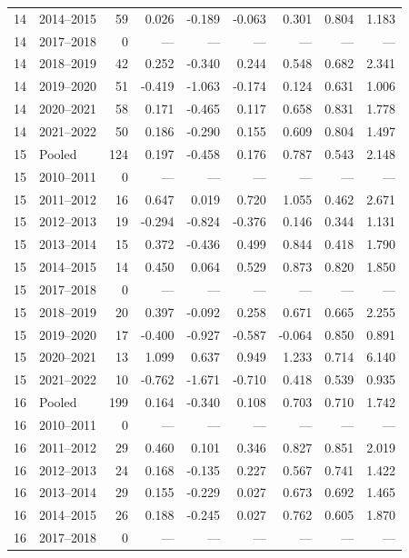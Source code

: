 \begin{longtable}{llrrrrrrr}
14 & 2014--2015 & 59 & 0.026 & -0.189 & -0.063 & 0.301 & 0.804 & 1.183 \\
14 & 2017--2018 & 0 & --- & --- & --- & --- & --- & --- \\
14 & 2018--2019 & 42 & 0.252 & -0.340 & 0.244 & 0.548 & 0.682 & 2.341 \\
14 & 2019--2020 & 51 & -0.419 & -1.063 & -0.174 & 0.124 & 0.631 & 1.006 \\
14 & 2020--2021 & 58 & 0.171 & -0.465 & 0.117 & 0.658 & 0.831 & 1.778 \\
14 & 2021--2022 & 50 & 0.186 & -0.290 & 0.155 & 0.609 & 0.804 & 1.497 \\
15 & Pooled & 124 & 0.197 & -0.458 & 0.176 & 0.787 & 0.543 & 2.148 \\
15 & 2010--2011 & 0 & --- & --- & --- & --- & --- & --- \\
15 & 2011--2012 & 16 & 0.647 & 0.019 & 0.720 & 1.055 & 0.462 & 2.671 \\
15 & 2012--2013 & 19 & -0.294 & -0.824 & -0.376 & 0.146 & 0.344 & 1.131 \\
15 & 2013--2014 & 15 & 0.372 & -0.436 & 0.499 & 0.844 & 0.418 & 1.790 \\
15 & 2014--2015 & 14 & 0.450 & 0.064 & 0.529 & 0.873 & 0.820 & 1.850 \\
15 & 2017--2018 & 0 & --- & --- & --- & --- & --- & --- \\
15 & 2018--2019 & 20 & 0.397 & -0.092 & 0.258 & 0.671 & 0.665 & 2.255 \\
15 & 2019--2020 & 17 & -0.400 & -0.927 & -0.587 & -0.064 & 0.850 & 0.891 \\
15 & 2020--2021 & 13 & 1.099 & 0.637 & 0.949 & 1.233 & 0.714 & 6.140 \\
15 & 2021--2022 & 10 & -0.762 & -1.671 & -0.710 & 0.418 & 0.539 & 0.935 \\
16 & Pooled & 199 & 0.164 & -0.340 & 0.108 & 0.703 & 0.710 & 1.742 \\
16 & 2010--2011 & 0 & --- & --- & --- & --- & --- & --- \\
16 & 2011--2012 & 29 & 0.460 & 0.101 & 0.346 & 0.827 & 0.851 & 2.019 \\
16 & 2012--2013 & 24 & 0.168 & -0.135 & 0.227 & 0.567 & 0.741 & 1.422 \\
16 & 2013--2014 & 29 & 0.155 & -0.229 & 0.027 & 0.673 & 0.692 & 1.465 \\
16 & 2014--2015 & 26 & 0.188 & -0.245 & 0.027 & 0.762 & 0.605 & 1.870 \\
16 & 2017--2018 & 0 & --- & --- & --- & --- & --- & --- \\

\end{longtable}

